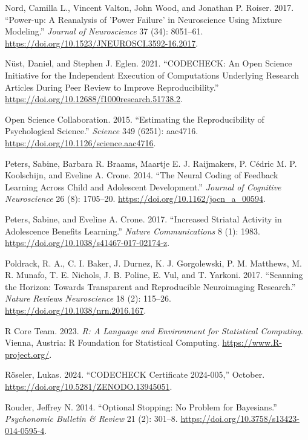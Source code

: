\documentclass[
  letterpaper,
  DIV=11,
  numbers=noendperiod]{scrartcl}
\newlength{\cslhangindent}
\newenvironment{CSLReferences}[2] %
 {\begin{list}{}{%
  \setlength{\itemindent}{0pt}
  \setlength{\leftmargin}{0pt}
  \setlength{\parsep}{0pt}
  \ifodd #1
   \setlength{\leftmargin}{\cslhangindent}
   \setlength{\itemindent}{-1\cslhangindent}
  \fi
  \setlength{\itemsep}{#2\baselineskip}}}
 {\end{list}}
\begin{document}
\begin{CSLReferences}{1}{0}
Nord, Camilla L., Vincent Valton, John Wood, and Jonathan P. Roiser.
2017. {``Power-up: A Reanalysis of 'Power Failure' in Neuroscience Using
Mixture Modeling.''} \emph{Journal of Neuroscience} 37 (34): 8051--61.
\url{https://doi.org/10.1523/JNEUROSCI.3592-16.2017}.

Nüst, Daniel, and Stephen J. Eglen. 2021. {``CODECHECK: An Open Science
Initiative for the Independent Execution of Computations Underlying
Research Articles During Peer Review to Improve Reproducibility.''}
\url{https://doi.org/10.12688/f1000research.51738.2}.

Open Science Collaboration. 2015. {``Estimating the Reproducibility of
Psychological Science.''} \emph{Science} 349 (6251): aac4716.
\url{https://doi.org/10.1126/science.aac4716}.

Peters, Sabine, Barbara R. Braams, Maartje E. J. Raijmakers, P. Cédric
M. P. Koolschijn, and Eveline A. Crone. 2014. {``The Neural Coding of
Feedback Learning Across Child and Adolescent Development.''}
\emph{Journal of Cognitive Neuroscience} 26 (8): 1705--20.
\url{https://doi.org/10.1162/jocn_a_00594}.

Peters, Sabine, and Eveline A. Crone. 2017. {``Increased Striatal
Activity in Adolescence Benefits Learning.''} \emph{Nature
Communications} 8 (1): 1983.
\url{https://doi.org/10.1038/s41467-017-02174-z}.

Poldrack, R. A., C. I. Baker, J. Durnez, K. J. Gorgolewski, P. M.
Matthews, M. R. Munafo, T. E. Nichols, J. B. Poline, E. Vul, and T.
Yarkoni. 2017. {``Scanning the Horizon: Towards Transparent and
Reproducible Neuroimaging Research.''} \emph{Nature Reviews
Neuroscience} 18 (2): 115--26.
\url{https://doi.org/10.1038/nrn.2016.167}.

R Core Team. 2023. \emph{R: A Language and Environment for Statistical
Computing}. Vienna, Austria: R Foundation for Statistical Computing.
\url{https://www.R-project.org/}.

Röseler, Lukas. 2024. {``CODECHECK Certificate 2024-005,''} October.
\url{https://doi.org/10.5281/ZENODO.13945051}.

Rouder, Jeffrey N. 2014. {``Optional Stopping: No Problem for
Bayesians.''} \emph{Psychonomic Bulletin \& Review} 21 (2): 301--8.
\url{https://doi.org/10.3758/s13423-014-0595-4}.


\end{CSLReferences}
\end{document}

